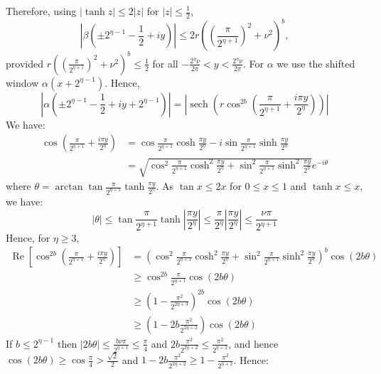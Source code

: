 \documentclass[aps,floatfix,10pt,amssymb,amsfont,amsmath,superscriptaddress,float,nofootinbib,longbibliography,nobalancelastpage,twocolumn]{revtex4-2}
\begin{document}
Therefore, using $|\tanh z|\leq2|z|$ for $|z|\leq\frac12$,
\begin{equation}
\left|\beta\left(\pm2^{\eta-1}-\frac12+iy\right)\right|
\leq
2r\left(
\left(\frac{\pi}{2^{\eta+1}}\right)^2+\nu^2
\right)^{b},
\label{eq:verticalbetabound}
\end{equation}
provided $r\left(
\left(\frac{\pi}{2^{\eta+1}}\right)^2+\nu^2
\right)^{b}\leq\frac12$ for all $-\frac{2^{\eta}\nu}{2\pi}<y<\frac{2^{\eta}\nu}{2\pi}$.
For $\alpha$ we use the shifted window $\alpha(x+2^{\eta-1})$. Hence,
\begin{equation}
    \left|\alpha(\pm2^{\eta-1}-\frac12+iy+2^{\eta-1})\right| = \left|\operatorname{sech}\!\left(
r\cos^{2b}\left(\frac{\pi}{2^{\eta+1}} +\frac{i\pi y}{2^{\eta}}\right)
\right)\right|
\end{equation}
We have:
\begin{align}
   \cos\left(\frac{\pi}{2^{\eta+1}} +\frac{i \pi y}{2^{\eta}}\right) &= \cos \frac{\pi}{2^{\eta+1}} \cosh \frac{ \pi y}{2^{\eta}} -i \sin \frac{\pi}{2^{\eta+1}} \sinh \frac{ \pi y}{2^{\eta}} \\
   &= \sqrt{\cos^2 \frac{\pi}{2^{\eta+1}} \cosh^2 \frac{ \pi y}{2^{\eta}}+\sin^2 \frac{\pi}{2^{\eta+1}} \sinh^2 \frac{ \pi y}{2^{\eta}} }e^{-i\theta}
\end{align}
where $\theta = \arctan \tan \frac{\pi}{2^{\eta+1}} \tanh \frac{ \pi y}{2^{\eta}} $. As $\tan x \leq 2x$ for $ 0\leq x \leq 1$ and $\tanh x \leq x$, we have:
\begin{equation}
    |\theta| \leq \tan \frac{\pi}{2^{\eta+1}} \tanh \left|\frac{ \pi y}{2^{\eta}}\right| \leq \frac{\pi}{2^{\eta}}\left|\frac{ \pi y}{2^{\eta}}\right|\leq \frac{\nu\pi}{2^{\eta+1}}
\end{equation}
Hence, for $\eta \geq 3$,
\begin{align}
   \operatorname{Re} \left[\cos^{2b}\left(\frac{\pi}{2^{\eta+1}} +\frac{i \pi y}{2^{\eta}}\right) \right] &= \left(\cos^2 \frac{\pi}{2^{\eta+1}} \cosh^2 \frac{ \pi y}{2^{\eta}}+\sin^2 \frac{\pi}{2^{\eta+1}} \sinh^2 \frac{ \pi y}{2^{\eta}} \right)^{b} \cos (2b \theta) \\
   &\geq \cos^{2b} \frac{\pi}{2^{\eta+1}} \cos (2b\theta)\\
   & \geq \left(1-\frac{\pi^2}{2^{2\eta+3}}\right)^{2b} \cos (2b\theta)\\
   & \geq \left(1-2b\frac{\pi^2}{2^{2\eta+2}}\right)\cos (2b\theta)
\end{align}
If $b \leq 2^{\eta-1}$ then $|2b\theta| \leq \frac{b\nu \pi}{2^{\eta+1}} \leq \frac{\pi}{4}$ and $2b\frac{\pi^2}{2^{2\eta+2}} \leq \frac{\pi^2}{2^{\eta+2}}$, and hence $\cos (2b \theta) \geq \cos \frac{\pi}{4} > \frac{\sqrt{2}}{2}$ and $ 1-2b\frac{\pi^2}{2^{2\eta+2}}\geq 1-\frac{\pi^2}{2^{\eta+2}}$. Hence:
\end{document}
